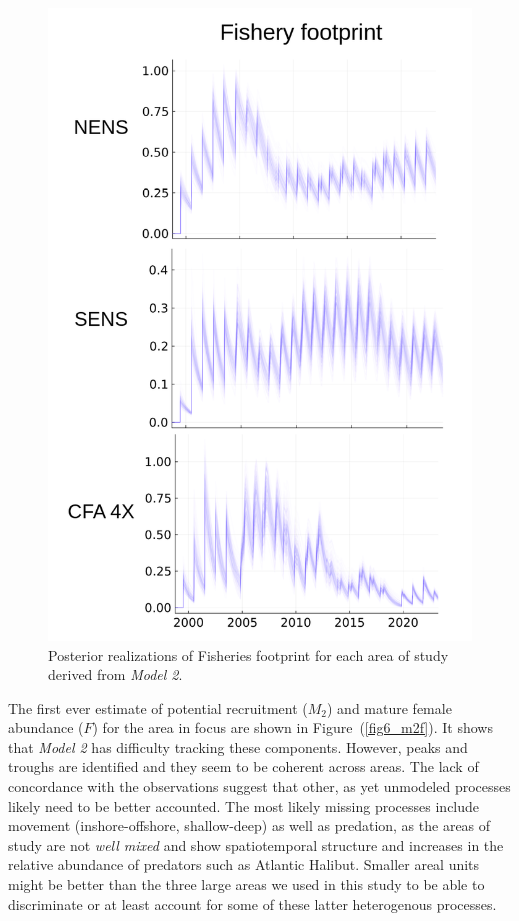 \documentclass[
	letterpaper, %
	10pt, %
]{article}
\begin{document}
	 
	\begin{figure}
		\includegraphics[width=12cm]{media/footprint.png}
		\caption{Posterior realizations of Fisheries footprint for
		each area of study derived from \emph{Model 2}.}
		\label{fig8}
		\end{figure} 

	The first ever estimate of potential recruitment ($M_{2}$) and mature female abundance ($F$) for the area in focus are shown in Figure~(\ref{fig6_m2f}). It shows that \emph{Model 2} has difficulty tracking these components.
	However, peaks and troughs are identified and they seem to be coherent
	across areas. The lack of concordance with the observations suggest
	that other, as yet unmodeled processes likely need to be better accounted.
	The most likely missing processes include movement (inshore-offshore,
	shallow-deep) as well as predation, as the areas of study are not
	\emph{well mixed} and show spatiotemporal structure and increases in the relative abundance of predators such as Atlantic Halibut. Smaller areal units might be better than the three large areas we used in this
	study to be able to discriminate or at least account for some of these latter heterogenous processes.
	
\end{document}
